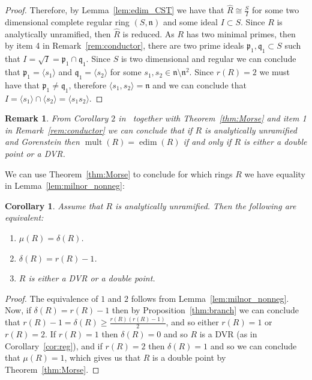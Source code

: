 \documentclass{article}
\newtheorem{remark}[theorem]{Remark}
\newtheorem{corollary}[theorem]{Corollary}
\DeclareMathOperator{\edim}{edim}
\DeclareMathOperator{\mult}{mult}
\numberwithin{theorem}{section}
\begin{document}
\begin{proof}
    Therefore, by Lemma~\ref{lem:edim_CST} we have that $\hat{R} \cong \frac{S}{I}$ for some two dimensional complete regular ring $(S, \mathfrak{n})$ and some ideal $I \subset S$. Since $R$ is analytically unramified, then $\hat{R}$ is reduced. As $R$ has two minimal primes, then by item 4 in Remark~\ref{rem:conductor}, there are two prime ideals $\mathfrak{p}_1, \mathfrak{q}_1 \subset S$ such that $I = \sqrt{I} = \mathfrak{p}_1 \cap \mathfrak{q}_1$. Since $S$ is two dimensional and regular we can conclude that $\mathfrak{p}_1 =  \langle s_1 \rangle  $ and $\mathfrak{q}_1 =  \langle s_2 \rangle  $ for some $s_1, s_2 \in \mathfrak{n} \setminus \mathfrak{n}^2$. Since $r(R)=2$ we must have that $\mathfrak{p}_1 \neq \mathfrak{q}_1$, therefore $\langle s_1, s_2 \rangle = \mathfrak{n}$ and we can conclude that $I = \langle s_1 \rangle \cap \langle s_2 \rangle = \langle s_1s_2 \rangle$. 
\end{proof}

\begin{remark}
    \textup{From Corollary $2$ in~\cite{ooishi1991conductor} together with Theorem~\ref{thm:Morse} and item 1 in Remark~\ref{rem:conductor} we can conclude that if $R$ is analytically unramified and Gorenstein then $\mult(R)=\edim(R)$ if and only if $R$ is either a double point or a DVR. }
\end{remark}

We can use Theorem~\ref{thm:Morse} to conclude for which rings $R$ we have equality in Lemma~\ref{lem:milnor_nonneg}: 

\begin{corollary}
    Assume that $R$ is analytically unramified. Then the following are equivalent:
    \begin{enumerate}
        \item $\mu(R)=\delta(R)$.
        \item $\delta(R)=r(R)-1$. 
        \item $R$ is either a DVR or a double point. 
    \end{enumerate}
\end{corollary}

\begin{proof}
    The equivalence of $1$ and $2$ follows from Lemma~\ref{lem:milnor_nonneg}. Now, if $\delta(R)=r(R)-1$ then by Proposition~\ref{thm:branch} we can conclude that $r(R)-1 = \delta(R) \geq \frac{r(R)(r(R)-1)}{2}$, and so either $r(R)=1$ or $r(R)=2$. If $r(R)=1$ then $\delta(R)=0$ and so $R$ is a DVR (as in Corollary~\ref{cor:reg}), and if $r(R)=2$ then $\delta(R)=1$ and so we can conclude that $\mu(R)=1$, which gives us that $R$ is a double point by  Theorem~\ref{thm:Morse}.
\end{proof}
\end{document}

